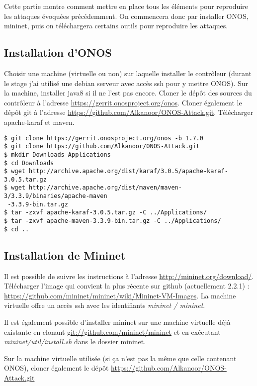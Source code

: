 Cette partie montre comment mettre en place tous les éléments pour reproduire les attaques évoquées précédemment. On commencera donc par installer ONOS, mininet, puis on téléchargera certains outils pour reproduire les attaques.

\subsection{Installation d'ONOS}

Choisir une machine (virtuelle ou non) sur laquelle installer le contrôleur (durant le stage j'ai utilisé une debian serveur avec accès ssh pour y mettre ONOS). Sur la machine, installer java8 si il ne l'est pas encore. Cloner le dépôt des sources du contrôleur à l'adresse \url{https://gerrit.onosproject.org/onos}. Cloner également le dépôt git à l'adresse \url{https://github.com/Alkanoor/ONOS-Attack.git}. Télécharger apache-karaf et maven.

\begin{verbatim}
$ git clone https://gerrit.onosproject.org/onos -b 1.7.0
$ git clone https://github.com/Alkanoor/ONOS-Attack.git
$ mkdir Downloads Applications
$ cd Downloads
$ wget http://archive.apache.org/dist/karaf/3.0.5/apache-karaf-3.0.5.tar.gz
$ wget http://archive.apache.org/dist/maven/maven-3/3.3.9/binaries/apache-maven
 -3.3.9-bin.tar.gz
$ tar -zxvf apache-karaf-3.0.5.tar.gz -C ../Applications/
$ tar -zxvf apache-maven-3.3.9-bin.tar.gz -C ../Applications/
$ cd ..
\end{verbatim}

\subsection{Installation de Mininet}

Il est possible de suivre les instructions à l'adresse \url{http://mininet.org/download/}. Télécharger l'image qui convient la plus récente sur github (actuellement 2.2.1) : \url{https://github.com/mininet/mininet/wiki/Mininet-VM-Images}. La machine virtuelle offre un accès ssh avec les identifiants \textit{mininet / mininet}.

Il est également possible d'installer mininet sur une machine virtuelle déjà existante en clonant \url{git://github.com/mininet/mininet} et en exécutant \textit{mininet/util/install.sh} dans le dossier mininet.

Sur la machine virtuelle utilisée (si ça n'est pas la même que celle contenant ONOS), cloner également le dépôt \url{https://github.com/Alkanoor/ONOS-Attack.git}

